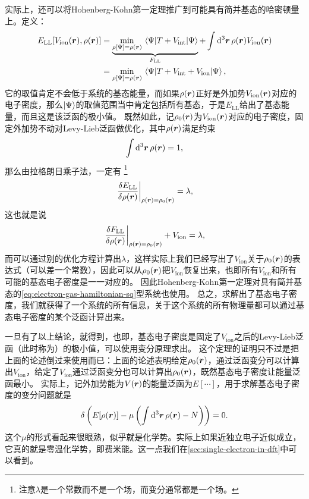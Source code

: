 实际上，还可以将Hohenberg-Kohn第一定理推广到可能具有简并基态的哈密顿量上。定义：
\begin{equation}
    \begin{aligned}
        E_\text{LL} [V_\text{ion}(\vb*{r}), \rho(\vb*{r})]  &= \underbrace{\min_{\rho[\Psi]=\rho(\vb*{r})} \mel{\Psi}{{T} + {V}_\text{int}}{\Psi}}_{F_\text{LL}} + \int \dd[3]{\vb*{r}} \rho(\vb*{r}) V_\text{ion} (\vb*{r}) \\
        &= \min_{\rho[\Psi]=\rho(\vb*{r})} \mel{\Psi}{{T} + {V_\text{int}} + {V}_\text{ion}}{\Psi},
    \end{aligned}
    \label{eq:levy-lieb}
\end{equation}
它的取值肯定不会低于系统的基态能量，而如果$\rho(\vb*{r})$正好是外加势$V_\text{ion}(\vb*{r})$对应的电子密度，那么$\ket{\Psi}$的取值范围当中肯定包括所有基态，于是$E_\text{LL}$给出了基态能量，而且这是该泛函的极小值。
既然如此，记$\rho_0(\vb*{r})$为$V_\text{ion}(\vb*{r})$对应的电子密度，固定外加势不动对Levy-Lieb泛函做优化，其中$\rho(\vb*{r})$满足约束
\[
    \int \dd[3]{\vb*{r}} \rho(\vb*{r}) = 1,
\]
那么由拉格朗日乘子法，一定有%
\footnote{注意$\lambda$是一个常数而不是一个场，而变分通常都是一个场。}%
\[
    \eval{\fdv{E_\text{LL}}{\rho(\vb*{r})}}_{\rho(\vb*{r}) = \rho_0 (\vb*{r})} = \lambda,
\]
这也就是说
\[
    \eval{\fdv{F_\text{LL}}{\rho(\vb*{r})}}_{\rho(\vb*{r}) = \rho_0(\vb*{r})} + V_\text{ion} = \lambda,
\]
而可以通过别的优化方程计算出$\lambda$，这样实际上我们已经写出了$V_\text{ion}$关于$\rho_0(\vb*{r})$的表达式（可以差一个常数），因此可以从$\rho_0(\vb*{r})$把$V_\text{ion}$恢复出来，也即所有$V_\text{ion}$和所有可能的基态电子密度是一一对应的。
因此Hohenberg-Kohn第一定理对具有简并基态的\eqref{eq:electron-gas-hamiltonian-sq}型系统也使用。
总之，求解出了基态电子密度，我们就获得了一个系统的所有信息，关于这个系统的所有物理量都可以通过基态电子密度的某个泛函计算出来。

一旦有了以上结论，就得到，也即，基态电子密度是固定了$V_\text{ion}$之后的Levy-Lieb泛函（此时称为）的极小值，可以使用变分原理求出。
这个定理的证明只不过是把上面的论述倒过来使用而已：上面的论述表明给定$\rho_0(\vb*{r})$，通过泛函变分可以计算出$V_\text{ion}$，给定了$V_\text{ion}$通过泛函变分也可以计算出$\rho_0(\vb*{r})$，既然基态电子密度让能量泛函最小。
实际上，记外加势能为$V(\vb*{r})$的能量泛函为$E[\cdots]$，用于求解基态电子密度的变分问题就是
\begin{equation}
    \var \left( E[\rho(\vb*{r})] - \mu \left( \int \dd[3]{\vb*{r}} \rho(\vb*{r}) - N \right) \right) = 0.
    \label{eq:dft-variation-principle}
\end{equation}
这个$\mu$的形式看起来很眼熟，似乎就是化学势。实际上如果近独立电子近似成立，它真的就是零温化学势，即费米能。这一点我们在\autoref{sec:single-electron-in-dft}中可以看到。

